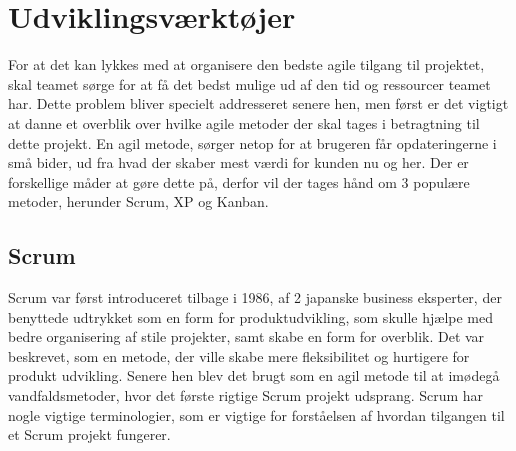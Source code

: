 
\chapter{Udviklingsværktøjer}\label{ch:udviklingsv}

For at det kan lykkes med at organisere den bedste agile tilgang til projektet, skal teamet sørge for at få det bedst mulige ud af den tid og ressourcer teamet har. Dette problem bliver specielt addresseret senere hen, men først er det vigtigt at danne et overblik over hvilke agile metoder der skal tages i betragtning til dette projekt. En agil metode, sørger netop for at brugeren får opdateringerne i små bider, ud fra hvad der skaber mest værdi for kunden nu og her. Der er forskellige måder at gøre dette på, derfor vil der tages hånd om 3 populære metoder, herunder Scrum, XP og Kanban. 

\section{Scrum}

Scrum var først introduceret tilbage i 1986, af 2 japanske business eksperter, der benyttede udtrykket som en form for produktudvikling, som skulle hjælpe med bedre organisering af stile projekter, samt skabe en form for overblik. Det var beskrevet, som en metode, der ville skabe mere fleksibilitet og hurtigere for produkt udvikling. Senere hen blev det brugt som en agil metode til at imødegå vandfaldsmetoder, hvor det første rigtige Scrum projekt udsprang. \cite{ScrumHistory}  Scrum har nogle vigtige terminologier, som er vigtige for forståelsen af hvordan tilgangen til et Scrum projekt fungerer. 

